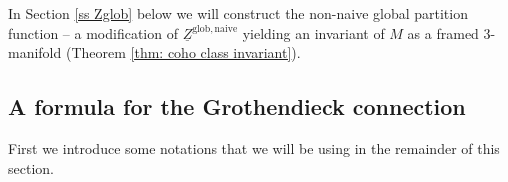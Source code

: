 \documentclass[11pt,a4paper]{amsart}
\theoremstyle{plain} %
\theoremstyle{definition}
\theoremstyle{remark}
\newcommand{\Sym}{\operatorname{Sym}}
\newcommand{\mr}{\mathrm}
\newcommand{\M}{\mathcal{M}}
\newcommand{\wh}{\widehat}
\newcommand{\ul}{\underline}
\begin{document}
{In Section \ref{ss Zglob} below we will construct the non-naive global partition function -- a modification of $\ul{Z}^\mr{glob,naive}$ yielding an invariant of $M$ as a framed 3-manifold (Theorem \ref{thm: coho class invariant}).


\subsection{A formula for the Grothendieck connection}
First we introduce some notations that we will be using in the remainder of this section.

}
\end{document}
